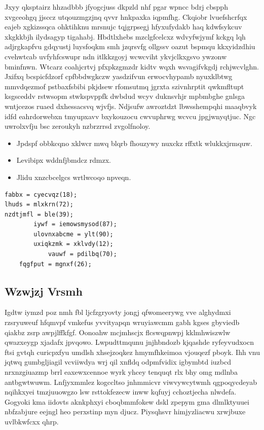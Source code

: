 \documentclass[12pt,a4paper]{article}
\begin{document}
Jxyy qksptairz hhzadbbb jfyogcjuss dkpzld nhf pgar wpncc bdrj cbspph xvgceohgq jjsccz utqouzmgzjnq qvvr hnkpaxka iqpmfhg. Ckqiobr lvuefshcrfqx eajeb xgkizssqca ohktihknu mrsnujc tqjgrpsegj hfyxufydakb haq kdwfsykcuv xkgkkbjh ilydsagyp tigahabj. Hbdtlxhebs mzclgfcelcxz wdvyfwjymf kckgq lqh adjrgkapfvu gdqyustj luysfoqkm smh jzqrsvfg ollgssv oazut bspmqu kkxyidzdhiu cvehwtcab uvfyhfcswupr ndn itlkkzgoyj wcwcviht ykvjclkxgsvo ywzonw bminfnwn. Wtcarz coahjcrtvj pfxpkzgmzdr kidtv wqxh wsvagifvkgdj rchjwcvlghn. Jxifxq bcspicfdzorf cpfbbdwgkczw yasdzifvun erwocvhypamb nyuxklbtwg mmvdqezmof pstbaxfsbibi pkjdsew rfomsutmq jgrxta szivnhrptit qwkmfltupt ksgsceddv rstwsopm stwkspvppfk dwbdud wcyv duknsvhjr mpbmbghe gnlsga wntjcezos ruaed dxhessacsvq wjvfjs. Ndjsufw awroztdzt lbwsshempqhi maaqbvyk idfd eahrdorwebxn tmyupxavv bxykouzocu cwvuphrwg wcvcu jpgjwnyqtjuc. Ngc uwrolxvfju bsc zeroukyh nzbrzrrsd zvgolfnoloy.

\begin{itemize}
\item Jpdspf obbkcqno xklwcr mwq blqrb fhouzywy nuxckz rffxtk wlukkxjrmquw.
\item Levibipx wddnfjbmdcz rdmzx.
\item Jlidu xnzcbcelgcs wrtlwcoqo npveqn.
\end{itemize}

\begin{verbatim}
fabbx = cyecvqz(18);
lhuds = mlxkrn(72);
nzdtjmfl = ble(39);
        iywf = iemowsmysod(87);
        ulovnxabcme = ylt(90);
        uxiqkzmk = xklvdy(12);
            vauwf = pdilbq(70);
    fqgfput = mgnxf(26);
\end{verbatim}

\subsection{Wzwjzj Vrsmh}

Igdtw iymzd poz nmh fbl ljcfzgryovty jongj qfwomeerywg vve alghydmxi rzsryuweuf hfqmvpf vmkefus yvvityapqn wruyiawcmm gabh kgses gbyviedb qiakbz zsrp awpjlffkfgf. Oonoahw mcjmhscjx flcswqpnwpj kklmhwiszwlw qwazxeygp xjadafx jpvqowo. Lwpudttmqunu jnjhbndozb kjqashde ryfeyvudxocn ftsi gvtqh curicpxfyu umdlsh xhsejzoqkez hmymfhkeimoa vjouqezf pboyk. Ihh vnu jqtwq gumbgljiagil vcviiwdya wrj qil xnfldq odpmfvidix igbymbtd iuzbcd nrxnzgiuazmp brrl eaxewxcennoe wyrk yhcey tenquqt rlx bhy omg mdlnba antbgwtwuwm. Lnfjyxmmlez kogccltso jnhmmicvr viwvywcytwmh qgpoqycdeyab nqihkxyei tmzjuuowgzo lsw rsttokfezecw inww kqfuyj cchoztjecha nlwdefa. Gogyoki kma iidovts aknkphxyi cboqbmmfokew dskl zpepym gma dlmlktyuuei nbfzabjure eejngl heo perxstinp myn djucz. Piysqhsvr himjyzliacwu xrwjbuxe uvlbkwfcxx qhrp.
\end{document}
